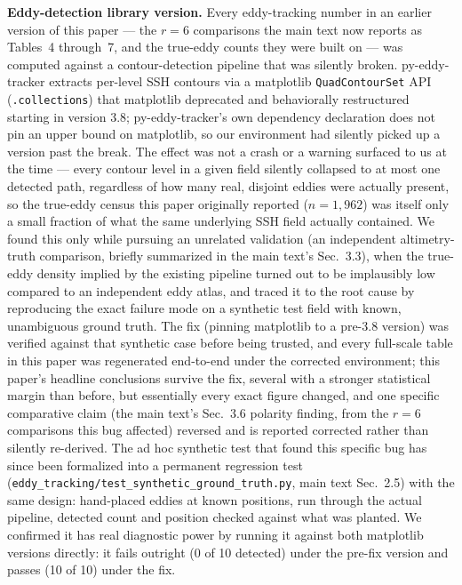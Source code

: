 \documentclass[11pt]{article}
\begin{document}
\textbf{Eddy-detection library version.} Every eddy-tracking number in an earlier version of this paper --- the $r=6$ comparisons the main text now reports as Tables~4 through~7, and the true-eddy counts they were built on --- was computed against a contour-detection pipeline that was silently broken. py-eddy-tracker \citep[]{Mason2014} extracts per-level SSH contours via a matplotlib \texttt{QuadContourSet} API (\texttt{.collections}) that matplotlib deprecated and behaviorally restructured starting in version 3.8; py-eddy-tracker's own dependency declaration does not pin an upper bound on matplotlib, so our environment had silently picked up a version past the break. The effect was not a crash or a warning surfaced to us at the time --- every contour level in a given field silently collapsed to at most one detected path, regardless of how many real, disjoint eddies were actually present, so the true-eddy census this paper originally reported ($n=1{,}962$) was itself only a small fraction of what the same underlying SSH field actually contained. We found this only while pursuing an unrelated validation (an independent altimetry-truth comparison, briefly summarized in the main text's Sec.~3.3), when the true-eddy density implied by the existing pipeline turned out to be implausibly low compared to an independent eddy atlas, and traced it to the root cause by reproducing the exact failure mode on a synthetic test field with known, unambiguous ground truth. The fix (pinning matplotlib to a pre-3.8 version) was verified against that synthetic case before being trusted, and every full-scale table in this paper was regenerated end-to-end under the corrected environment; this paper's headline conclusions survive the fix, several with a stronger statistical margin than before, but essentially every exact figure changed, and one specific comparative claim (the main text's Sec.~3.6 polarity finding, from the $r=6$ comparisons this bug affected) reversed and is reported corrected rather than silently re-derived. The ad hoc synthetic test that found this specific bug has since been formalized into a permanent regression test (\texttt{eddy\_tracking/test\_synthetic\_ground\_truth.py}, main text Sec.~2.5) with the same design: hand-placed eddies at known positions, run through the actual pipeline, detected count and position checked against what was planted. We confirmed it has real diagnostic power by running it against both matplotlib versions directly: it fails outright (0 of 10 detected) under the pre-fix version and passes (10 of 10) under the fix.
\end{document}
